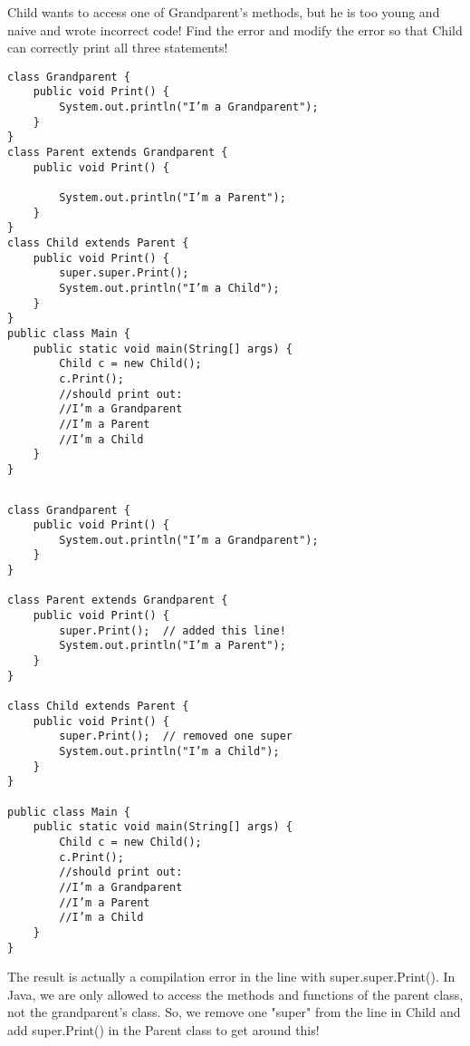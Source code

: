 \begin{blocksection}
\question

Child wants to access one of Grandparent's methods, but he is too young and naive and wrote incorrect code! Find the error and modify the error so that Child can correctly print all three statements!

\begin{lstlisting}
class Grandparent {
    public void Print() {
        System.out.println("I’m a Grandparent");
    }
}
class Parent extends Grandparent {
    public void Print() {
        
        System.out.println("I’m a Parent");
    }
}
class Child extends Parent {
    public void Print() {
        super.super.Print();
        System.out.println("I’m a Child");
    }
}
public class Main {
    public static void main(String[] args) {
        Child c = new Child();
        c.Print(); 
        //should print out:
        //I’m a Grandparent
        //I’m a Parent
        //I’m a Child
    }
}

\end{lstlisting}
\begin{verbatim}
\end{verbatim}

\newpage
\begin{solution}
\begin{verbatim}
class Grandparent {
    public void Print() {
        System.out.println("I’m a Grandparent");
    }
}
  
class Parent extends Grandparent {
    public void Print() {
        super.Print();  // added this line!
        System.out.println("I’m a Parent");
    }
}
  
class Child extends Parent {
    public void Print() {
        super.Print();  // removed one super
        System.out.println("I’m a Child");
    }
}
  
public class Main {
    public static void main(String[] args) {
        Child c = new Child();
        c.Print(); 
        //should print out:
        //I’m a Grandparent
        //I’m a Parent
        //I’m a Child
    }
}

\end{verbatim}
The result is actually a compilation error in the line with super.super.Print(). In Java, we are only allowed to access the methods and functions of the parent class, not the grandparent's class. So, we remove one "super" from the line in Child and add super.Print() in the Parent class to get around this!

\end{solution}

\end{blocksection}


